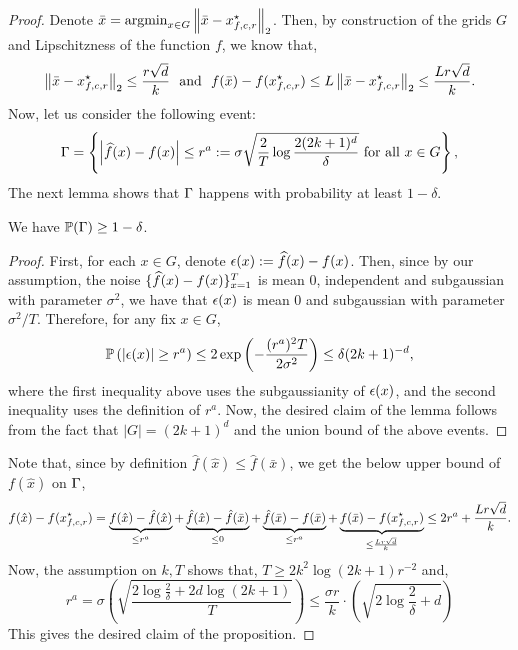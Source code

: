 \begin{proof}
Denote $\bar{x} = \argmin_{x\in G} \ltwo{\bar{x} - x_{f, c, r}\opt}$. Then, by 
construction of the grids $G$ and Lipschitzness of the function $f$, we know 
that, 
\begin{equation*}
\ltwo{\bar{x} - x_{f, c, r}\opt} \leq \frac{r\sqrt{d}}{k}~~\text{and}~~
	f(\bar{x}) - f(x_{f, c, r}\opt) \leq L \ltwo{\bar{x} - x_{f, c, r}\opt}  
		\leq \frac{Lr\sqrt{d}}{k}.
\end{equation*}
Now, let us consider the following event: 
\begin{equation*}
\event = \left\{\left|\what{f}(x) - f(x)\right| \leq r^a \defeq
	\sigma \sqrt{\frac{2}{T} \log \frac{2(2k+1)^d}{\delta}}
	~\text{for all}~x \in G\right\}, 
\end{equation*}
The next lemma shows that $\event$ happens with probability at least $1-\delta$. 
\begin{lemma}
We have $\P(\Gamma) \geq 1-\delta$. 
\end{lemma}
\begin{proof}
First, for each $x \in G$, denote $\noise(x) \defeq \what{f}(x) - f(x)$.  Then, since 
by our assumption, the noise $\{\what{f}(x) - f(x)\}_{x=1}^{T}$ is mean $0$, independent 
and subgaussian with parameter $\sigma^2$, we have that $\noise(x)$ is mean $0$ 
and subgaussian with parameter $\sigma^2/T$. Therefore, for any fix $x\in G$, 
\begin{align*}
\P\left(|\noise(x)| \geq r^a \right) 
		\leq 2\exp\left(-\frac{(r^a)^2T}{2\sigma^2}\right) 
			\leq \delta (2k+1)^{-d}, 
\end{align*}
where the first inequality above uses the subgaussianity of $\noise(x)$, and 
the second inequality uses the definition of $r^a$. 
Now, the desired claim of the lemma follows from the fact that 
$|G| = (2k+1)^d$ and the union bound of the above events. 
\end{proof}
Note that, since by definition $\hat{f}(\hat{x}) \leq \hat{f}(\bar{x})$, we get 
the below upper bound of $f(\hat{x})$ on $\event$, 
\begin{equation*}
f(\hat{x}) - f(x_{f, c, r}\opt) = \underbrace{f(\hat{x}) - \hat{f}(\hat{x})}_{\leq r^a}
	+ \underbrace{\hat{f}(\hat{x}) - \hat{f}(\bar{x})}_{\leq 0}
	+ \underbrace{\hat{f}(\bar{x}) - f(\bar{x})}_{\leq  r^a} 
	+ \underbrace{f(\bar{x}) - f(x_{f, c, r}\opt)}_{\leq \frac{Lr\sqrt{d}}{k}} 
		\leq 2r^a + \frac{Lr\sqrt{d}}{k}.
\end{equation*}
Now, the assumption on $k, T$ shows that, $T \geq 2k^2\log(2k+1)r^{-2}$ and, 
\begin{equation*}
r^a = \sigma \left(\sqrt{\frac{2\log \frac{2}{\delta} + 2d\log(2k+1)}{T}} \right)
	\leq \frac{\sigma r}{k} \cdot \left(\sqrt{2 \log \frac{2}{\delta} + d}\right)
\end{equation*}
This gives the desired claim of the proposition. 
\end{proof}

